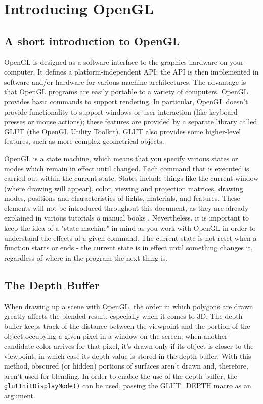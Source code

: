 \section{Introducing OpenGL}
\label{sec:opengl}
\lstset{language=C++}
\subsection{A short introduction to OpenGL}
OpenGL is designed as a software interface to the graphics 
hardware on your computer. It defines a platform-independent API;
the API is then implemented in software and/or hardware for 
various machine architectures. The advantage is that OpenGL 
programs are easily portable to a variety of computers. 
OpenGL provides basic commands to support rendering. 
In particular, OpenGL doesn't provide functionality to support
windows or user interaction (like keyboard presses or mouse 
actions); these features are provided by a separate library called
GLUT (the OpenGL Utility Toolkit). GLUT also provides some 
higher-level features, such as more complex geometrical objects.
%

%
OpenGL is a state machine, which means that you specify various 
states or modes which remain in effect until changed.
Each command that is executed is carried out within the current 
state. States include things like the current window (where
drawing will appear), color, viewing and projection matrices, 
drawing modes, positions and characteristics of lights,
materials, and features. These elements will not be introduced 
throughout this document, as they are already explained in
various tutorials \cite{opengl:brieftutorial} o manual books 
\cite{opengl:redbook}.
%
Nevertheless, it is important to keep the idea of a 
"state machine" in mind as you work with OpenGL in order to 
understand the effects of a given command. The current state 
is not reset when a function starts or ends - the current state
is in effect until something changes it, regardless of where 
in the program the next thing is. 
%
\subsection{The Depth Buffer}
When drawing up a scene with OpenGL, the order in which polygons are drawn
greatly affects the blended result, especially when it comes to 3D.
%
The depth buffer keeps track of the distance between the viewpoint and 
the portion of the object occupying a given pixel in a window on the 
screen; when another candidate color arrives for that pixel, it's drawn 
only if its object is closer to the viewpoint, in which case its depth
value is stored in the depth buffer. With this method, obscured (or hidden)
portions of surfaces aren't drawn and, therefore, aren't used for
blending.
%
In order to enable the use of the depth buffer, the 
\texttt{glutInitDisplayMode()} can be used, passing the 
GLUT\_DEPTH macro as an argument.
%

